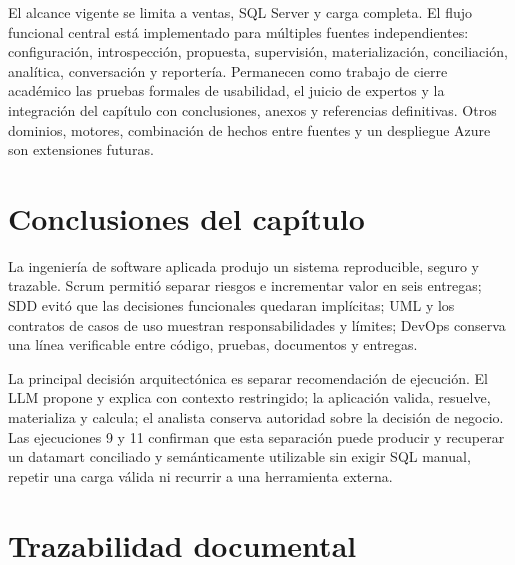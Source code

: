 \documentclass[11pt,letterpaper]{article}
\begin{document}
El alcance vigente se limita a ventas, SQL Server y carga completa. El flujo funcional central está implementado para múltiples fuentes independientes: configuración, introspección, propuesta, supervisión, materialización, conciliación, analítica, conversación y reportería. Permanecen como trabajo de cierre académico las pruebas formales de usabilidad, el juicio de expertos y la integración del capítulo con conclusiones, anexos y referencias definitivas. Otros dominios, motores, combinación de hechos entre fuentes y un despliegue Azure son extensiones futuras.

\section{Conclusiones del capítulo}

La ingeniería de software aplicada produjo un sistema reproducible, seguro y trazable. Scrum permitió separar riesgos e incrementar valor en seis entregas; SDD evitó que las decisiones funcionales quedaran implícitas; UML y los contratos de casos de uso muestran responsabilidades y límites; DevOps conserva una línea verificable entre código, pruebas, documentos y entregas.

La principal decisión arquitectónica es separar recomendación de ejecución. El LLM propone y explica con contexto restringido; la aplicación valida, resuelve, materializa y calcula; el analista conserva autoridad sobre la decisión de negocio. Las ejecuciones 9 y 11 confirman que esta separación puede producir y recuperar un datamart conciliado y semánticamente utilizable sin exigir SQL manual, repetir una carga válida ni recurrir a una herramienta externa.

\section{Trazabilidad documental}
\end{document}
